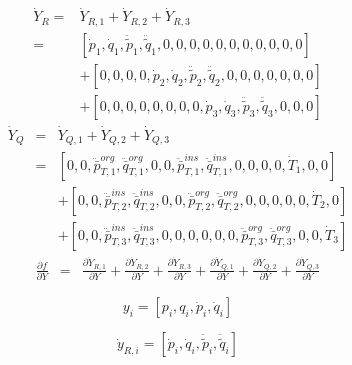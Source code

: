 \documentclass[a4paper,10pt]{article}
\begin{document}
\begin{align*}
\dot{Y}_R = {} & \dot{Y}_{R,1} + \dot{Y}_{R,2} + \dot{Y}_{R,3}\\
         =  {} &  [   \dot{p}_1, \dot{q}_1, \ddot{\tilde{p}}_1, \ddot{\tilde{q}}_1, 0, 0, 0, 0, 0, 0, 0, 0, 0, 0, 0 ]\\
               & + [ 0, 0, 0, 0, \dot{p}_2, \dot{q}_2, \ddot{\tilde{p}}_2, \ddot{\tilde{q}}_2, 0, 0, 0, 0, 0, 0, 0 ]\\
               & + [ 0, 0, 0, 0, 0, 0, 0, 0, \dot{p}_3, \dot{q}_3, \ddot{\tilde{p}}_3, \ddot{\tilde{q}}_3, 0, 0, 0 ]
\end{align*}
\begin{eqnarray*}
\dot{Y}_Q & = & \dot{Y}_{Q,1} + \dot{Y}_{Q,2} + \dot{Y}_{Q,3}\\
          & = &   [ 0, 0, \ddot{\bar{p}}_{T,1}^{org}, \ddot{\bar{q}}_{T,1}^{org}, 0, 0, \ddot{\bar{p}}_{T,1}^{ins}, \ddot{\bar{q}}_{T,1}^{ins}, 0, 0, 0, 0, \dot{T}_1, 0, 0 ]\\
          &   & + [ 0, 0, \ddot{\bar{p}}_{T,2}^{ins}, \ddot{\bar{q}}_{T,2}^{ins}, 0, 0, \ddot{\bar{p}}_{T,2}^{org}, \ddot{\bar{q}}_{T,2}^{org}, 0, 0, 0, 0, 0, \dot{T}_2, 0 ]\\
          &   & + [ 0, 0, \ddot{\bar{p}}_{T,3}^{ins}, \ddot{\bar{q}}_{T,3}^{ins}, 0, 0, 0, 0, 0, 0, \ddot{\bar{p}}_{T,3}^{org}, \ddot{\bar{q}}_{T,3}^{org}, 0, 0, \dot{T}_3 ]
\end{eqnarray*}
\begin{eqnarray*}
\frac{\partial f}{\partial Y}
        & = & \frac{\partial\dot{Y}_{R,1}}{\partial Y} + \frac{\partial\dot{Y}_{R,2}}{\partial Y} + \frac{\partial\dot{Y}_{R,3}}{\partial Y}
              + \frac{\partial\dot{Y}_{Q,1}}{\partial Y} + \frac{\partial\dot{Y}_{Q,2}}{\partial Y} + \frac{\partial\dot{Y}_{Q,3}}{\partial Y}
\end{eqnarray*}


\begin{equation}
y_{i} = [p_i, q_i, \dot{p}_i, \dot{q}_i]
\end{equation}

\begin{equation}
\dot{y}_{R,i} = [\dot{p}_i, \dot{q}_i, \ddot{\tilde{p}}_i, \ddot{\tilde{q}}_i]
\end{equation}

\newcommand{\zm}[1]{\ensuremath{ {\color{opaqueblue} 0_{#1} } }}
\end{document}
